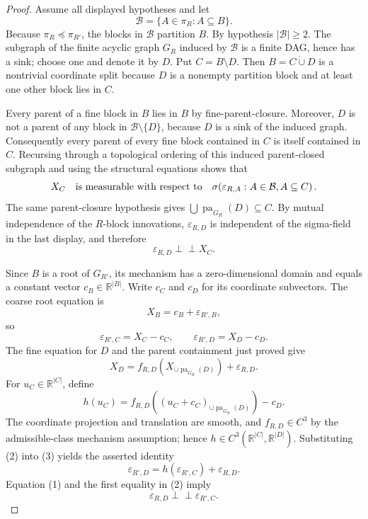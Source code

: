 \documentclass{article}
\begin{document}
\begin{proof}
Assume all displayed hypotheses and let
\[
 \mathcal B=\{A\in\pi_R:A\subseteq B\}.
\]
Because \(\pi_R\preceq\pi_{R'}\), the blocks in \(\mathcal B\) partition
\(B\).  By hypothesis \(|\mathcal B|\geq2\).  The subgraph of the finite
acyclic graph \(G_R\) induced by \(\mathcal B\) is a finite DAG, hence has a
sink; choose one and denote it by \(D\).  Put \(C=B\setminus D\).  Then
\(B=C\mathbin{\dot\cup}D\) is a nontrivial coordinate split because \(D\) is
a nonempty partition block and at least one other block lies in \(C\).

Every parent of a fine block in \(B\) lies in \(B\) by fine-parent-closure.
Moreover, \(D\) is not a parent of any block in \(\mathcal B\setminus\{D\}\),
because \(D\) is a sink of the induced graph.  Consequently every parent of
every fine block contained in \(C\) is itself contained in \(C\).  Recursing
through a topological ordering of this induced parent-closed subgraph and using
the structural equations shows that
\[
 X_C\quad\hbox{is measurable with respect to}\quad
 \sigma\!\left(\varepsilon_{R,A}:A\in\mathcal B, A\subseteq C\right).
\]
The same parent-closure hypothesis gives
\(\bigcup\operatorname{pa}_{G_R}(D)\subseteq C\).  By mutual independence of
the \(R\)-block innovations,
\(\varepsilon_{R,D}\) is independent of the sigma-field in the last display,
and therefore
\[
 \varepsilon_{R,D}\perp\!\!\!\perp X_C. \tag{1}
\]

Since \(B\) is a root of \(G_{R'}\), its mechanism has a zero-dimensional
domain and equals a constant vector \(c_B\in\mathbb R^{|B|}\).  Write
\(c_C\) and \(c_D\) for its coordinate subvectors.  The coarse root equation
is
\[
 X_B=c_B+\varepsilon_{R',B},
\]
so
\[
 \varepsilon_{R',C}=X_C-c_C,
 \qquad
 \varepsilon_{R',D}=X_D-c_D. \tag{2}
\]
The fine equation for \(D\) and the parent containment just proved give
\[
 X_D=f_{R,D}\!\left(X_{\cup\operatorname{pa}_{G_R}(D)}\right)
       +\varepsilon_{R,D}. \tag{3}
\]
For \(u_C\in\mathbb R^{|C|}\), define
\[
 h(u_C)=
 f_{R,D}\!\left((u_C+c_C)_{\cup\operatorname{pa}_{G_R}(D)}\right)-c_D.
\]
The coordinate projection and translation are smooth, and
\(f_{R,D}\in C^3\) by the admissible-class mechanism assumption; hence
\(h\in C^3(\mathbb R^{|C|},\mathbb R^{|D|})\).  Substituting (2) into (3)
yields the asserted identity
\[
 \varepsilon_{R',D}
 =h(\varepsilon_{R',C})+\varepsilon_{R,D}. \tag{4}
\]
Equation (1) and the first equality in (2) imply
\[
 \varepsilon_{R,D}\perp\!\!\!\perp\varepsilon_{R',C}. \tag{5}
\]


\end{proof}
\end{document}
